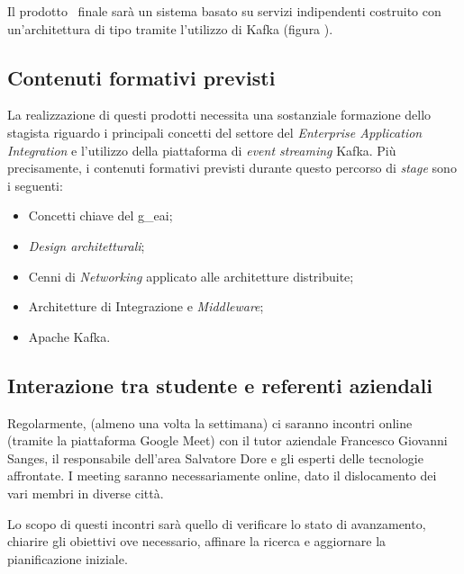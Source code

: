 Il prodotto \software\ finale sarà un sistema basato su servizi indipendenti costruito con un'architettura di tipo  tramite l'utilizzo di Kafka (figura \thefigure).

\subsection{Contenuti formativi previsti}

La realizzazione di questi prodotti necessita una sostanziale formazione dello stagista riguardo i principali concetti del settore del \textit{Enterprise Application Integration} e l'utilizzo della piattaforma di \textit{event streaming} Kafka.
Più precisamente, i contenuti formativi previsti durante questo percorso di \textit{stage} sono i seguenti:
\begin{itemize}
  \item Concetti chiave del \gls{g_eai};
  \item \textit{Design architetturali};
  \item Cenni di \textit{Networking} applicato alle architetture distribuite;
  \item Architetture di Integrazione e \textit{Middleware};
  \item Apache Kafka.
\end{itemize}

\subsection{Interazione tra studente e referenti aziendali}
Regolarmente, (almeno una volta la settimana) ci saranno incontri online (tramite la piattaforma Google Meet) con il tutor aziendale Francesco Giovanni Sanges, il responsabile dell’area  Salvatore Dore e gli esperti delle tecnologie affrontate.
I meeting saranno necessariamente online, dato il dislocamento dei vari membri in diverse città.

Lo scopo di questi incontri sarà quello di verificare lo stato di avanzamento, chiarire gli obiettivi ove necessario, affinare la ricerca e aggiornare la pianificazione iniziale.




